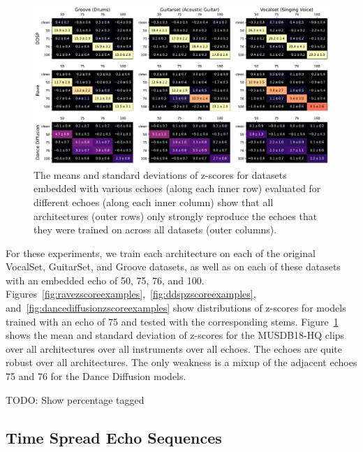 \documentclass[letterpaper]{article} %
\begin{document}
\begin{figure}
    \centering
    \includegraphics[width=\textwidth]{figs/AllSingleEchoZScores.pdf}
    
    \caption{The means and standard deviations of z-scores for datasets embedded with various echoes (along each inner row) evaluated for different echoes (along each inner column) show that all architectures (outer rows) only strongly reproduce the echoes that they were trained on across all datasets (outer columns).}
    \label{fig:singleechotable}
\end{figure}

For these experiments, we train each architecture on each of the original VocalSet, GuitarSet, and Groove datasets, as well as on each of these datasets with an embedded echo of 50, 75, 76, and 100.  Figures~\ref{fig:ravezscoreexamples},~\ref{fig:ddspzscoreexamples}, and~\ref{fig:dancediffusionzscoreexamples} show distributions of z-scores for models trained with an echo of 75 and tested with the corresponding stems.  Figure~\ref{fig:singleechotable} shows the mean and standard deviation of z-scores for the MUSDB18-HQ clips over all architectures over all instruments over all echoes.  The echoes are quite robust over all architectures.  The only weakness is a mixup of the adjacent echoes 75 and 76 for the Dance Diffusion models.


TODO: Show percentage tagged




\subsection{Time Spread Echo Sequences}
\end{document}
